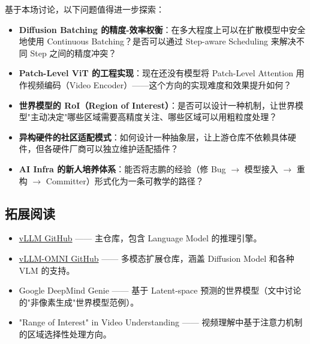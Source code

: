 \documentclass[a4paper]{article}
\begin{document}
基于本场讨论，以下问题值得进一步探索：

\begin{itemize}
\item \textbf{Diffusion Batching 的精度-效率权衡}：在多大程度上可以在扩散模型中安全地使用 Continuous Batching？是否可以通过 Step-aware Scheduling 来解决不同 Step 之间的精度冲突？
\item \textbf{Patch-Level ViT 的工程实现}：现在还没有模型将 Patch-Level Attention 用作视频编码（Video Encoder）——这个方向的实现难度和效果提升如何？
\item \textbf{世界模型的 RoI（Region of Interest）}：是否可以设计一种机制，让世界模型"主动决定"哪些区域需要高精度关注、哪些区域可以用粗粒度处理？
\item \textbf{异构硬件的社区适配模式}：如何设计一种抽象层，让上游仓库不依赖具体硬件，但各硬件厂商可以独立维护适配插件？
\item \textbf{AI Infra 的新人培养体系}：能否将志鹏的经验（修 Bug $\rightarrow$ 模型接入 $\rightarrow$ 重构 $\rightarrow$ Committer）形式化为一条可教学的路径？
\end{itemize}

\subsection{拓展阅读}

\begin{itemize}
\item \href{https://github.com/vllm-project/vllm}{vLLM GitHub} —— 主仓库，包含 Language Model 的推理引擎。
\item \href{https://github.com/vllm-project/vllm-omni}{vLLM-OMNI GitHub} —— 多模态扩展仓库，涵盖 Diffusion Model 和各种 VLM 的支持。
\item Google DeepMind Genie —— 基于 Latent-space 预测的世界模型（文中讨论的"非像素生成"世界模型范例）。
\item "Range of Interest" in Video Understanding —— 视频理解中基于注意力机制的区域选择性处理方向。
\end{itemize}
\end{document}
